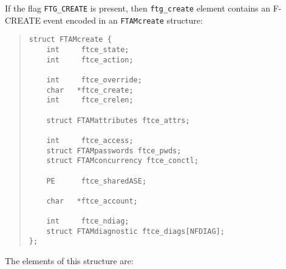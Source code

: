 If the flag \verb"FTG_CREATE" is present,
then \verb"ftg_create" element contains an {\sf F-CREATE\/} event encoded in an
\verb"FTAMcreate" structure:
\begin{quote}\small\begin{verbatim}
struct FTAMcreate {
    int     ftce_state;
    int     ftce_action;

    int     ftce_override;
    char   *ftce_create;
    int     ftce_crelen;

    struct FTAMattributes ftce_attrs;

    int     ftce_access;
    struct FTAMpasswords ftce_pwds;
    struct FTAMconcurrency ftce_conctl;

    PE      ftce_sharedASE;

    char   *ftce_account;

    int     ftce_ndiag;
    struct FTAMdiagnostic ftce_diags[NFDIAG];
};
\end{verbatim}\end{quote}
The elements of this structure are:
